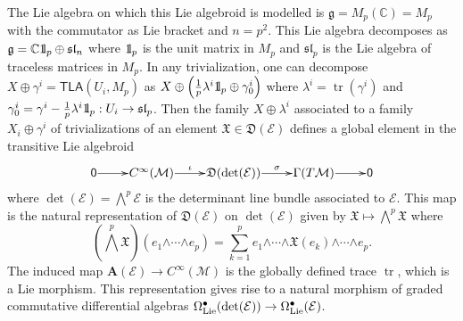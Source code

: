 \documentclass[number]{elsarticle}
\theoremstyle{definition}
\theoremstyle{remark}
\numberwithin{equation}{section}
\begin{document}
The Lie algebra on which this Lie algebroid is modelled is ${{\mathfrak g}} = M_p({{\mathbb C}}) = M_p$ with the commutator as Lie bracket and $n= p^2$. This Lie algebra decomposes as ${{\mathfrak g}} = {{\mathbb C}} {{ \mathchoice {1\mskip-4mu\mathrm{l} } {1\mskip-4mu\mathrm{l} }{1\mskip-4.5mu\mathrm{l} } {1\mskip-5mu\mathrm{l}} }}_p \oplus {{\mathfrak{sl}}}_n$ where ${{ \mathchoice {1\mskip-4mu\mathrm{l} } {1\mskip-4mu\mathrm{l} }{1\mskip-4.5mu\mathrm{l} } {1\mskip-5mu\mathrm{l}} }}_p$ is the unit matrix in $M_p$ and ${{\mathfrak{sl}}}_p$ is the Lie algebra of traceless matrices in $M_p$. In any trivialization, one can decompose $X \oplus \gamma^i = {{{{\mathbf{\mathsf{{TLA}}}}}}}(U_i, M_p)$ as $X \oplus \left( \frac{1}{p} \lambda^i {{ \mathchoice {1\mskip-4mu\mathrm{l} } {1\mskip-4mu\mathrm{l} }{1\mskip-4.5mu\mathrm{l} } {1\mskip-5mu\mathrm{l}} }}_p \oplus \gamma_0^i \right)$ where $\lambda^i = \operatorname{tr}(\gamma^i)$ and $\gamma_0^i = \gamma^i - \frac{1}{p} \lambda^i {{ \mathchoice {1\mskip-4mu\mathrm{l} } {1\mskip-4mu\mathrm{l} }{1\mskip-4.5mu\mathrm{l} } {1\mskip-5mu\mathrm{l}} }}_p : U_i \rightarrow {{\mathfrak{sl}}}_p$. Then the family $X \oplus \lambda^i$ associated to a family $X_i \oplus \gamma^i$ of trivializations of an element ${{\mathfrak X}} \in {{\mathfrak D}}({{{{\mathcal{{E}}}}}})$ defines a global element in the transitive Lie algebroid
\begin{equation*}
\xymatrix@1{{{{{\mathsf{{0}}}}}} \ar[r] & {C^\infty({{{{\mathcal{{M}}}}}})} \ar[r]^-{\iota} & {{{\mathfrak D}}(\det({{{{\mathcal{{E}}}}}}))} \ar[r]^-{\sigma} & {\Gamma(T {{{{\mathcal{{M}}}}}})} \ar[r] & {{{{\mathsf{{0}}}}}}}
\end{equation*}
where $\det({{{{\mathcal{{E}}}}}}) = {{\textstyle\bigwedge}}^p {{{{\mathcal{{E}}}}}}$ is the determinant line bundle associated to ${{{{\mathcal{{E}}}}}}$. This map is the natural representation of ${{\mathfrak D}}({{{{\mathcal{{E}}}}}})$ on $\det({{{{\mathcal{{E}}}}}})$ given by ${{\mathfrak X}} \mapsto {{\textstyle\bigwedge}}^p {{\mathfrak X}}$ where
\begin{equation*}
\left( {{\textstyle\bigwedge}}^p {{\mathfrak X}} \right)(e_1 {\mathord{\wedge}} \cdots {\mathord{\wedge}} e_p) = \sum_{k=1}^p e_1 {\mathord{\wedge}} \cdots {\mathord{\wedge}} {{\mathfrak X}}(e_k) {\mathord{\wedge}} \cdots {\mathord{\wedge}} e_p.
\end{equation*}
The induced map ${{{{\mathbf{{A}}}}}}({{{{\mathcal{{E}}}}}}) \rightarrow C^\infty({{{{\mathcal{{M}}}}}})$ is the globally defined trace $\operatorname{tr}$, which is a Lie morphism. This representation gives rise to a natural morphism of graded commutative differential algebras $\Omega^{\bullet}_{{\text{\textup{Lie}}}}(\det({{{{\mathcal{{E}}}}}})) \rightarrow \Omega^{\bullet}_{{\text{\textup{Lie}}}}({{{{\mathcal{{E}}}}}})$.
\end{document}
